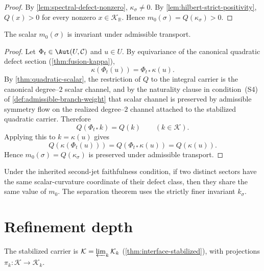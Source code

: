 \begin{proof}
By \cref{lem:spectral-defect-nonzero}, $\kappa_\sigma \neq 0$.
By \cref{lem:hilbert-strict-positivity}, $Q(x) > 0$ for every nonzero
$x \in \mathcal K_{\mathbb R}$.
Hence $m_0(\sigma) = Q(\kappa_\sigma) > 0$.
\end{proof}

\begin{theorem}
\label{thm:spectral-scalar-invariant}
The scalar $m_0(\sigma)$ is invariant under admissible transport.
\end{theorem}

\begin{proof}
Let $\Phi_t \in \Aut(U,\mathcal C)$ and $u \in U$.
By equivariance of the canonical quadratic defect section
(\cref{thm:fusion-kappa}),
\[
  \kappa(\Phi_t(u)) = \Phi_{t*}\kappa(u).
\]
By \cref{thm:quadratic-scalar}, the restriction of $Q$ to the integral
carrier is the canonical degree--\(2\) scalar channel, and by the
naturality clause in condition~\textup{(S4)} of
\cref{def:admissible-branch-weight} that scalar channel is preserved by
admissible symmetry flow on the realized degree--\(2\) channel attached
to the stabilized quadratic carrier. Therefore
\[
  Q(\Phi_{t*}k)=Q(k)
  \qquad
  (k\in \mathcal K).
\]
Applying this to $k=\kappa(u)$ gives
\[
  Q(\kappa(\Phi_t(u)))
  =
  Q(\Phi_{t*}\kappa(u))
  =
  Q(\kappa(u)).
\]
Hence $m_0(\sigma) = Q(\kappa_\sigma)$ is preserved under admissible
transport.
\end{proof}

\begin{remark}
\label{rem:m0-not-injective}
Under the inherited second-jet faithfulness condition, if two distinct
sectors have the same scalar-curvature coordinate of their defect
class, then they share the same value of $m_0$.
The separation theorem uses the strictly finer invariant $k_\sigma$.
\end{remark}

\section{Refinement depth}
\label{sec:spectral-depth}

The stabilized carrier is $\mathcal K = \varprojlim_k \mathcal K_k$
(\cref{thm:interface-stabilized}), with projections
$\pi_k : \mathcal K \to \mathcal K_k$.


